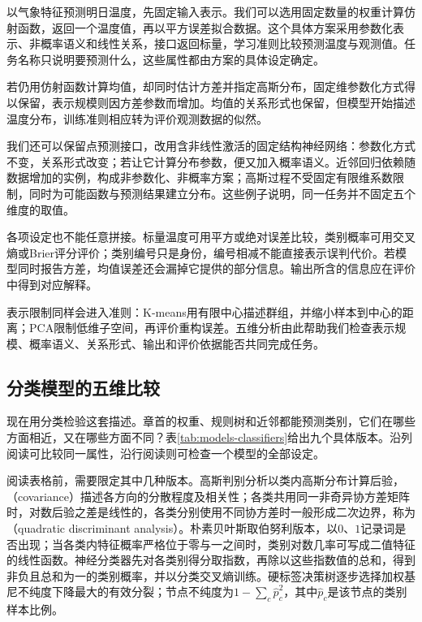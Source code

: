 以气象特征预测明日温度，先固定输入表示。我们可以选用固定数量的权重计算仿射函数，返回一个温度值，再以平方误差拟合数据。这个具体方案采用参数化表示、非概率语义和线性关系，接口返回标量，学习准则比较预测温度与观测值。任务名称只说明要预测什么，这些属性都由方案的具体设定确定。

若仍用仿射函数计算均值，却同时估计方差并指定高斯分布，固定维参数化方式得以保留，表示规模则因方差参数而增加。均值的关系形式也保留，但模型开始描述温度分布，训练准则相应转为评价观测数据的似然。

我们还可以保留点预测接口，改用含非线性激活的固定结构神经网络：参数化方式不变，关系形式改变；若让它计算分布参数，便又加入概率语义。近邻回归依赖随数据增加的实例，构成非参数化、非概率方案；高斯过程不受固定有限维系数限制，同时为可能函数与预测结果建立分布。这些例子说明，同一任务并不固定五个维度的取值。

各项设定也不能任意拼接。标量温度可用平方或绝对误差比较，类别概率可用交叉熵或Brier评分评价；类别编号只是身份，编号相减不能直接表示误判代价。若模型同时报告方差，均值误差还会漏掉它提供的部分信息。输出所含的信息应在评价中得到对应解释。

表示限制同样会进入准则：K-means用有限中心描述群组，并缩小样本到中心的距离；PCA限制低维子空间，再评价重构误差。五维分析由此帮助我们检查表示规模、概率语义、关系形式、输出和评价依据能否共同完成任务。

\subsection{分类模型的五维比较}
\label{sec:models-classification-grid}

现在用分类检验这套描述。章首的权重、规则树和近邻都能预测类别，它们在哪些方面相近，又在哪些方面不同？表\ref{tab:models-classifiers}给出九个具体版本。沿列阅读可比较同一属性，沿行阅读则可检查一个模型的全部设定。

阅读表格前，需要限定其中几种版本。高斯判别分析以类内高斯分布计算后验，（covariance）描述各方向的分散程度及相关性；各类共用同一非奇异协方差矩阵时，对数后验之差是线性的，各类分别使用不同协方差时一般形成二次边界，称为（quadratic discriminant analysis）。朴素贝叶斯取伯努利版本，以$0$、$1$记录词是否出现；当各类内特征概率严格位于零与一之间时，类别对数几率可写成二值特征的线性函数。神经分类器先对各类别得分取指数，再除以这些指数值的总和，得到非负且总和为一的类别概率，并以分类交叉熵训练。硬标签决策树逐步选择加权基尼不纯度下降最大的有效分裂；节点不纯度为$1-\sum_c\hat p_c^2$，其中$\hat p_c$是该节点的类别样本比例。

